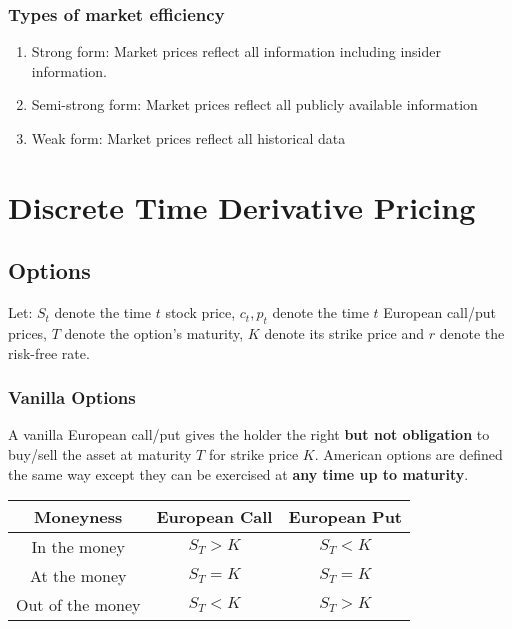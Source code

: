 \documentclass[11pt]{article}
\begin{document}
	\subsubsection{Types of market efficiency}
	\begin{enumerate}
		\item Strong form: Market prices reflect all information including insider information.
		\item Semi-strong form: Market prices reflect all publicly available information %
		\item Weak form: Market prices reflect all historical data 
	\end{enumerate}
	\newpage
	\section{Discrete Time Derivative Pricing}
	\subsection{Options}
	Let: \( S_t \) denote the time \( t \) stock price, \( c_t, p_t \) denote the time \( t \) European call/put prices, \( T \) denote the option's maturity, \( K \) denote its strike price and \( r \) denote the risk-free rate.
	\subsubsection{Vanilla Options}
	A vanilla European call/put gives the holder the right \textbf{but not obligation} to buy/sell the asset at maturity \( T \) for strike price \( K \). American options are defined the same way except they can be exercised at \textbf{any time up to maturity}.
	\begin{center}
		\begin{tabular}{ccc}
			\hline
			\hline
			\textbf{Moneyness} & \textbf{European Call} & \textbf{European Put} \\
			\hline
			In the money & \( S_T > K \) & \( S_T < K \)\\
			\hline
			At the money & \( S_T = K \) & \( S_T = K \)\\
			\hline
			Out of the money &  \( S_T < K \)& \( S_T > K \)\\
			\hline
			\end{tabular}
		\end{center}
\end{document}
